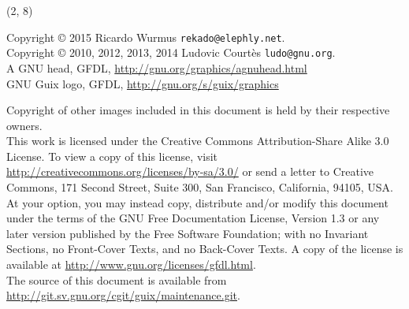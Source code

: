 \documentclass{beamer}
\begin{document}
\begin{frame}{}

  \begin{textblock}{12}(2, 8)
    \tiny{
      Copyright \copyright{} 2015 Ricardo Wurmus \texttt{rekado@elephly.net}.\\
      Copyright \copyright{} 2010, 2012, 2013, 2014 Ludovic Courtès \texttt{ludo@gnu.org}.
      \\[3.0mm]
      A GNU head, GFDL, \url{http://gnu.org/graphics/agnuhead.html}\\
      GNU Guix logo, GFDL, \url{http://gnu.org/s/guix/graphics}

      Copyright of other images included in this document is held by
      their respective owners.
      \\[3.0mm]
      This work is licensed under the \alert{Creative Commons
        Attribution-Share Alike 3.0} License.  To view a copy of this
      license, visit
      \url{http://creativecommons.org/licenses/by-sa/3.0/} or send a
      letter to Creative Commons, 171 Second Street, Suite 300, San
      Francisco, California, 94105, USA.
      \\[2.0mm]
      At your option, you may instead copy, distribute and/or modify
      this document under the terms of the \alert{GNU Free Documentation
        License, Version 1.3 or any later version} published by the Free
      Software Foundation; with no Invariant Sections, no Front-Cover
      Texts, and no Back-Cover Texts.  A copy of the license is
      available at \url{http://www.gnu.org/licenses/gfdl.html}.
      \\[2.0mm]
      The source of this document is available from
      \url{http://git.sv.gnu.org/cgit/guix/maintenance.git}.
    }
  \end{textblock}
\end{frame}
\end{document}
